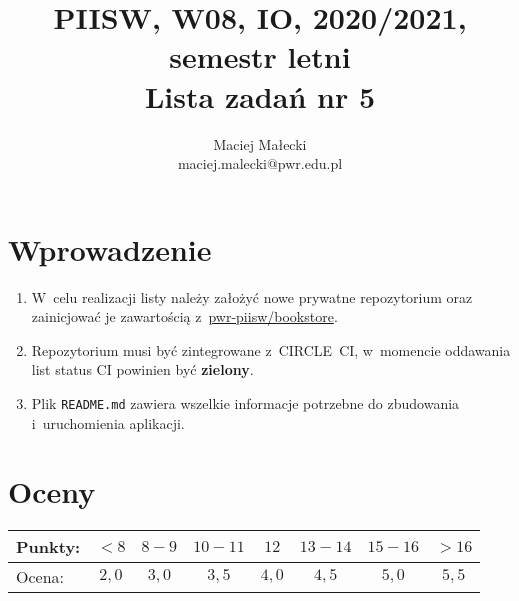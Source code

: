 \documentclass[12pt]{article}
\title{PIISW, W08, IO, 2020/2021, semestr letni\\Lista zadań nr 5}
\author{Maciej Małecki\\ \small maciej.malecki@pwr.edu.pl}
\begin{document}
    \maketitle

    \section*{Wprowadzenie}
        \begin{enumerate}
            \item W~celu realizacji listy należy założyć nowe prywatne repozytorium oraz zainicjować je zawartością z~\href{https://github.com/pwr-piisw/bookstore}{pwr-piisw/bookstore}.
			\item Repozytorium musi być zintegrowane z~CIRCLE~CI, w~momencie oddawania list status CI powinien być \textbf{zielony}.
			\item Plik \texttt{README.md} zawiera wszelkie informacje potrzebne do zbudowania i~uruchomienia aplikacji.
        \end{enumerate}

    \section*{Oceny}
    \begin{tabular}{|l|c|c|c|c|c|c|c|}
        \hline
        Punkty: & $<8$ & $8-9$ & $10-11$ & $12$ & $13-14$ & $15-16$ & $>16$ \\
        \hline
        Ocena:  & $2,0$ & $3,0$ & $3,5$ & $4,0$ & $4,5$ & $5,0$ & $5,5$ \\
        \hline
    \end{tabular}
\end{document}
